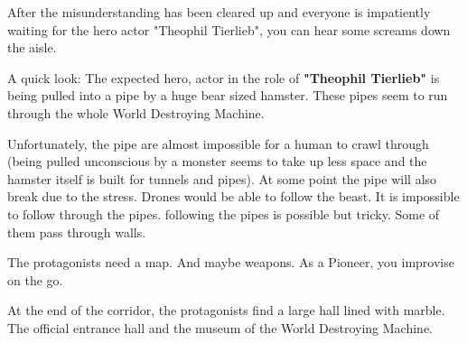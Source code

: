 After the misunderstanding has been cleared up and everyone is impatiently waiting for the hero actor "Theophil Tierlieb", you can hear some screams down the aisle.

A quick look: The expected hero, actor in the role of \textbf{"Theophil Tierlieb"} is being pulled into a pipe by a huge bear sized hamster. These pipes seem to run through the whole World Destroying Machine.

Unfortunately, the pipe are almost impossible for a human to crawl through (being pulled unconscious by a monster seems to take up less space and the hamster itself is built for tunnels and pipes). At some point the pipe will also break due to the stress. Drones would be able to follow the beast. It is impossible to follow through the pipes. following the pipes is possible but tricky. Some of them pass through walls.

The protagonists need a map. And maybe weapons. As a Pioneer, you improvise on the go.

At the end of the corridor, the protagonists find a large hall lined with marble. The official entrance hall and the museum of the World Destroying Machine.

